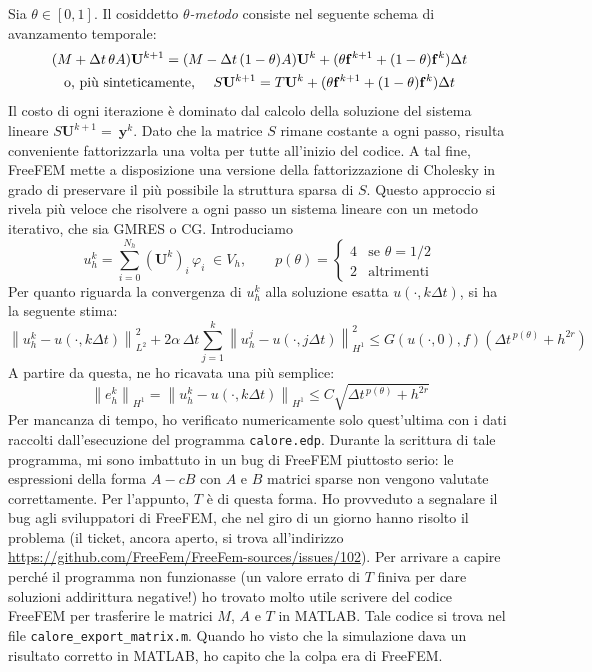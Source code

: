 \documentclass[a4paper]{article}
\renewcommand{\vec}[1]{\mathbf{#1}}
\newcommand{\normltwo}[1]{\left\lVert#1\right\rVert_{L^2}}
\newcommand{\normhone}[1]{\left\lVert#1\right\rVert_{H^1}}
\begin{document}
Sia $\theta \in [0,1]$.
Il cosiddetto \emph{$\theta$-metodo} consiste nel seguente schema di
avanzamento temporale:
\begin{gather*}
  (M + \Delta t \, \theta A) \vec{U}^{k+1}
= (M - \Delta t \, (1-\theta) A) \vec{U}^k
+ (\theta \vec{f}^{k+1} + (1-\theta) \vec{f}^k) \Delta t \\
\text{o, più sinteticamente, \quad $S \vec{U}^{k+1}
= T \vec{U}^k + (\theta \vec{f}^{k+1} + (1-\theta) \vec{f}^k) \Delta t$}
\end{gather*}
Il costo di ogni iterazione è dominato dal calcolo della soluzione del sistema lineare
$S \vec{U}^{k+1} =~\vec{y}^k$.
Dato che la matrice $S$ rimane costante a ogni passo, risulta conveniente
fattorizzarla una volta per tutte all'inizio del codice.
A tal fine, FreeFEM mette a disposizione una versione della fattorizzazione
di Cholesky in grado di preservare il più possibile la struttura sparsa di $S$.
Questo approccio si rivela più veloce che risolvere a ogni
passo un sistema lineare con un metodo iterativo, che sia GMRES o CG.
Introduciamo
\[
u_h^k = \sum_{i=0}^{N_h} (\vec{U}^k)_i \, \varphi_i \; \in V_h, \qquad
p(\theta) =
\begin{cases}
4 & \text{se $\theta = 1/2$} \\
2 & \text{altrimenti}
\end{cases}
\]
Per quanto riguarda la convergenza di $u_h^k$ alla soluzione esatta
$u(\cdot, k \Delta t)$, si ha la seguente stima:
\[
\normltwo{u_h^k - u(\cdot, k \Delta t)}^2
+ 2 \alpha \, \Delta t \sum_{j=1}^k {\normhone{u_h^j - u(\cdot, j \Delta t)}^2}
\leq G(u(\cdot,0),f) \left( \Delta t^{\, p(\theta)} + h^{2r} \right)
\]
A partire da questa, ne ho ricavata una più semplice:
\[
\normhone{e_h^k} = \normhone{u_h^k - u(\cdot, k \Delta t)}
\leq C \sqrt{\Delta t^{\, p(\theta)} + h^{2r}}
\]
Per mancanza di tempo, ho verificato numericamente solo quest'ultima
con i dati raccolti dall'esecuzione del programma \texttt{calore.edp}.
Durante la scrittura di tale programma, mi sono imbattuto in un bug di FreeFEM
piuttosto serio: le espressioni della forma $A-cB$ con $A$ e $B$ matrici sparse
non vengono valutate correttamente. Per l'appunto, $T$ è di questa forma.
Ho provveduto a segnalare il bug agli sviluppatori di FreeFEM,
che nel giro di un giorno hanno risolto il problema
(il ticket, ancora aperto, si trova all'indirizzo
\url{https://github.com/FreeFem/FreeFem-sources/issues/102}).
Per arrivare a capire perché il programma non funzionasse
(un valore errato di $T$ finiva per dare soluzioni addirittura negative!)
ho trovato molto utile scrivere del codice FreeFEM per trasferire le matrici
$M$, $A$ e $T$ in MATLAB. Tale codice si trova nel file
\texttt{calore\_export\_matrix.m}. Quando ho visto che la simulazione
dava un risultato corretto in MATLAB, ho capito che la colpa era di FreeFEM.
\end{document}
